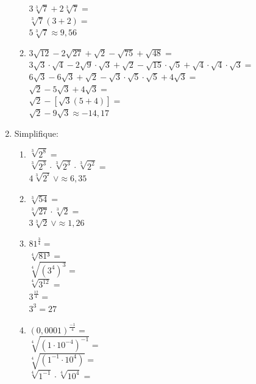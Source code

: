\documentclass[a4paper, 12pt]{article}
\begin{document}
\begin{enumerate}
\begin{enumerate}
    $ 3\sqrt[3]{7} + 2\sqrt[3]{7} = $ \\
    $ \sqrt[3]{7} \left ( 3 + 2 \right ) = $ \\
    $ 5\sqrt[3]{7} \approx 9,56 $ \\
  \item $ 3 \sqrt{12} - 2 \sqrt{27} + \sqrt{2} - \sqrt{75} + \sqrt{48} = $ \\
    $ 3 \sqrt{3} \cdot \sqrt{4} - 2 \sqrt{9} \cdot \sqrt{3} + \sqrt{2} - \sqrt{15} \cdot \sqrt{5} + \sqrt{4} \cdot \sqrt{4} \cdot \sqrt{3} = $ \\
    $ 6 \sqrt{3} - 6 \sqrt{3} + \sqrt{2} - \sqrt{3} \cdot \sqrt{5} \cdot \sqrt{5} + 4 \sqrt{3} = $ \\
    $ \sqrt{2} - 5\sqrt{3} + 4\sqrt{3} = $ \\
    $ \sqrt{2} - \left [ \sqrt{3} \left ( 5 + 4 \right ) \right ] = $ \\
    $ \sqrt{2} - 9\sqrt{3} \approx -14,17 $
  \end{enumerate}
\item Simplifique:
  \begin{enumerate}
  \item $ \sqrt[3]{2^8} = $ \\
    $ \sqrt[3]{2^3} \cdot \sqrt[3]{2^3} \cdot \sqrt[3]{2^2} = $ \\
    $ 4 \sqrt[3]{2^²} \  \vee \approx 6,35 $ \\ 
  \item $ \sqrt[3]{54} = $ \\
    $ \sqrt[3]{27} \cdot \sqrt[3]{2} = $ \\
    $ 3 \sqrt[3]{2} \ \vee \approx 1,26 $ \\
  \item $ 81^{\frac{3}{4}} = $ \\
    $ \sqrt[4]{81³} = $ \\
    $ \sqrt[4]{\left (3^4 \right)^3} = $ \\
    $ \sqrt[4]{3^{12}} = $ \\
    $ 3^{\frac{12}{4}} = $ \\
    $ 3^3 = 27 $ \\
  \item $ \left ( 0,0001 \right )^{\frac{-1}{4}} = $ \\
    $ \sqrt[4]{\left ( 1 \cdot 10^{-4} \right )^{-1}} = $ \\
    $ \sqrt[4]{\left ( 1^{-1} \cdot 10^4 \right ) } = $ \\
    $ \sqrt[4]{1^{-1}} \cdot \sqrt[4]{10^4} = $ \\

\end{enumerate}
\end{enumerate}
\end{document}
